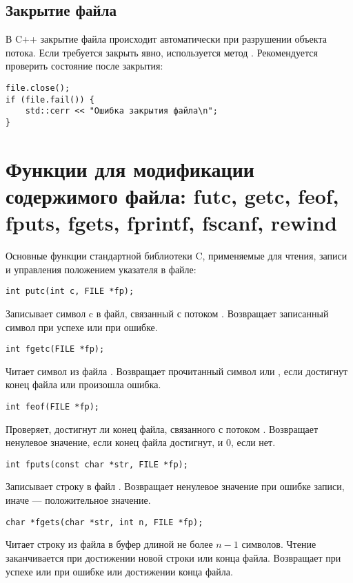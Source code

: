 \subsection{Закрытие файла}
В C++ закрытие файла происходит автоматически при разрушении объекта потока. Если требуется
закрыть явно, используется метод .
Рекомендуется проверить состояние после закрытия:
\begin{verbatim}
file.close();
if (file.fail()) {
    std::cerr << "Ошибка закрытия файла\n";
}
\end{verbatim}

\section{Функции для модификации содержимого файла: futc, getc, feof, fputs, fgets, fprintf, fscanf, rewind}
Основные функции стандартной библиотеки C, применяемые для чтения, записи и управления положением указателя в файле:

\begin{verbatim}
int putc(int c, FILE *fp);
\end{verbatim}
Записывает символ c в файл, связанный с потоком . Возвращает записанный символ при успехе или  при ошибке.

\begin{verbatim}
int fgetc(FILE *fp);
\end{verbatim}
Читает символ из файла . Возвращает прочитанный символ или , если достигнут конец файла или произошла ошибка.

\begin{verbatim}
int feof(FILE *fp);
\end{verbatim}
Проверяет, достигнут ли конец файла, связанного с потоком . Возвращает ненулевое значение, если конец файла достигнут, и 0, если нет.

\begin{verbatim}
int fputs(const char *str, FILE *fp);
\end{verbatim}
Записывает строку  в файл . Возвращает ненулевое значение при ошибке записи, иначе — положительное значение.

\begin{verbatim}
char *fgets(char *str, int n, FILE *fp);
\end{verbatim}
Читает строку из файла  в буфер  длиной не более $n-1$ символов. Чтение заканчивается при достижении новой строки или конца файла. Возвращает  при успехе или  при ошибке или достижении конца файла.

